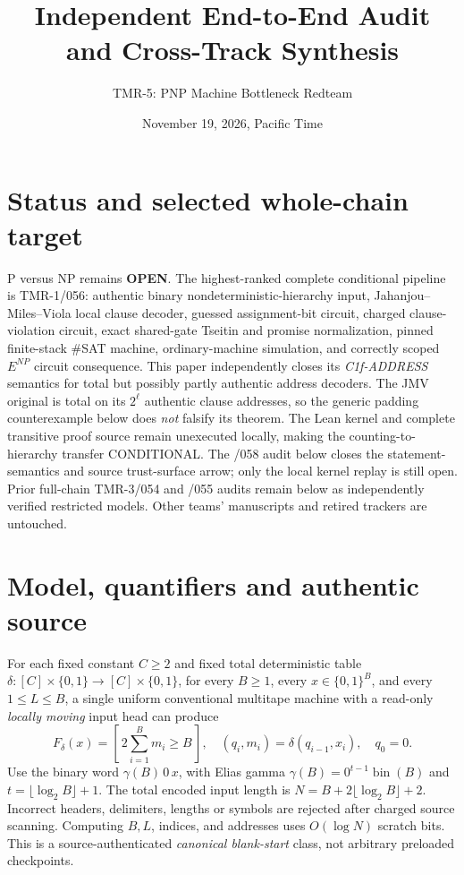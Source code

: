 \documentclass[11pt]{article}
\title{Independent End-to-End Audit and Cross-Track Synthesis}
\author{TMR-5: PNP Machine Bottleneck Redteam}
\date{November 19, 2026, Pacific Time}
\begin{document}
\maketitle
\section{Status and selected whole-chain target}
P versus NP remains \textbf{OPEN}. The highest-ranked complete conditional
pipeline is TMR-1/056: authentic binary nondeterministic-hierarchy input,
Jahanjou--Miles--Viola local clause decoder, guessed assignment-bit circuit,
charged clause-violation circuit, exact shared-gate Tseitin and promise
normalization, pinned finite-stack \#SAT machine, ordinary-machine
simulation, and correctly scoped \(E^{NP}\) circuit consequence.
This paper independently closes its \emph{C1f-ADDRESS} semantics for
total but possibly partly authentic address decoders. The JMV original
is total on its \(2^\ell\) authentic clause addresses, so the generic
padding counterexample below does \emph{not} falsify its theorem.
The Lean kernel and complete transitive proof source remain unexecuted
locally, making the counting-to-hierarchy transfer CONDITIONAL. The /058
audit below closes the statement-semantics and source trust-surface
arrow; only the local kernel replay is still open.
Prior full-chain TMR-3/054 and /055 audits remain below as independently
verified restricted models. Other teams' manuscripts and retired trackers
are untouched.

\section{Model, quantifiers and authentic source}
For each fixed constant \(C\ge2\) and fixed total deterministic table
\(\delta:[C]\times\{0,1\}\to[C]\times\{0,1\}\), for every \(B\ge1\),
every \(x\in\{0,1\}^B\), and every \(1\le L\le B\), a single
uniform conventional multitape machine with a read-only \emph{locally moving}
input head can produce
\[
F_\delta(x)=[\,2\sum_{i=1}^B m_i\ge B\,],
\quad (q_i,m_i)=\delta(q_{i-1},x_i),\quad q_0=0.
\]
Use the binary word \(\gamma(B)\,0\,x\), with Elias gamma
\(\gamma(B)=0^{t-1}\operatorname{bin}(B)\) and
\(t=\lfloor\log_2 B\rfloor+1\). The total encoded input length is
\(N=B+2\lfloor\log_2 B\rfloor+2\).
Incorrect headers, delimiters, lengths or symbols are rejected after
charged source scanning. Computing \(B,L\), indices, and addresses uses
\(O(\log N)\) scratch bits. This is a source-authenticated
\emph{canonical blank-start} class, not arbitrary preloaded checkpoints.
\end{document}
